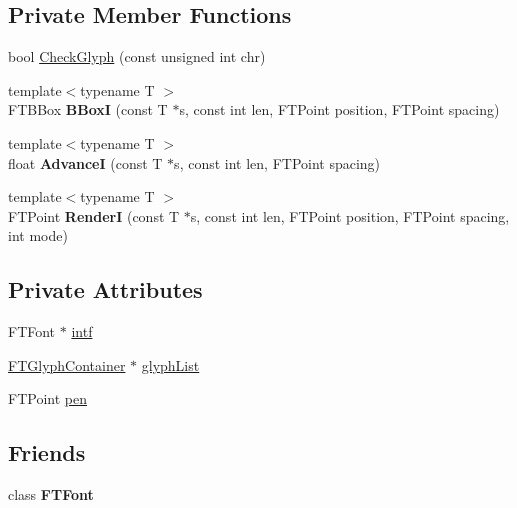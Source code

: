 \subsection*{Private Member Functions}
\begin{DoxyCompactItemize}
\item 
bool \hyperlink{class_f_t_font_impl_a320fee0df820ab4230ad063e37c1d27f}{Check\+Glyph} (const unsigned int chr)
\item 
{\footnotesize template$<$typename T $>$ }\\F\+T\+B\+Box {\bfseries B\+BoxI} (const T $\ast$s, const int len, F\+T\+Point position, F\+T\+Point spacing)\hypertarget{class_f_t_font_impl_a8766c7e8a4ea680f1c43f01373d46c08}{}\label{class_f_t_font_impl_a8766c7e8a4ea680f1c43f01373d46c08}

\item 
{\footnotesize template$<$typename T $>$ }\\float {\bfseries AdvanceI} (const T $\ast$s, const int len, F\+T\+Point spacing)\hypertarget{class_f_t_font_impl_a89d0db891a55a680e01b5f3b6ca10577}{}\label{class_f_t_font_impl_a89d0db891a55a680e01b5f3b6ca10577}

\item 
{\footnotesize template$<$typename T $>$ }\\F\+T\+Point {\bfseries RenderI} (const T $\ast$s, const int len, F\+T\+Point position, F\+T\+Point spacing, int mode)\hypertarget{class_f_t_font_impl_a3f98f91ee84d6707007a346ded8b25fc}{}\label{class_f_t_font_impl_a3f98f91ee84d6707007a346ded8b25fc}

\end{DoxyCompactItemize}
\subsection*{Private Attributes}
\begin{DoxyCompactItemize}
\item 
F\+T\+Font $\ast$ \hyperlink{class_f_t_font_impl_a28128c35b1fb792c49c19a48886113a3}{intf}
\item 
\hyperlink{class_f_t_glyph_container}{F\+T\+Glyph\+Container} $\ast$ \hyperlink{class_f_t_font_impl_a32498496c03476febf0e8291dcab28a6}{glyph\+List}
\item 
F\+T\+Point \hyperlink{class_f_t_font_impl_a7746a7659e50cb09906a408b49ac22e8}{pen}
\end{DoxyCompactItemize}
\subsection*{Friends}
\begin{DoxyCompactItemize}
\item 
class {\bfseries F\+T\+Font}\hypertarget{class_f_t_font_impl_a8db85445a08f6c3139ba842b37e5b183}{}\label{class_f_t_font_impl_a8db85445a08f6c3139ba842b37e5b183}

\end{DoxyCompactItemize}


